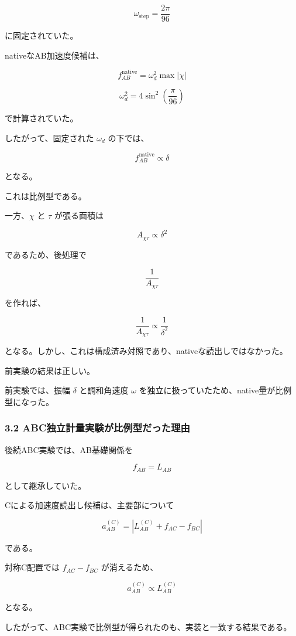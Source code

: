 \documentclass[
  a4paper,
]{ltjsarticle}
\begin{document}
\[
\omega_{\mathrm{step}}
=\frac{2\pi}{96}
\]

に固定されていた。

nativeなAB加速度候補は、

\[
f_{AB}^{\mathrm{native}}
=\omega_d^2\max|\chi|
\]

\[
\omega_d^2
=4\sin^2\left(\frac{\pi}{96}\right)
\]

で計算されていた。

したがって、固定された \(\omega_d\) の下では、

\[
f_{AB}^{\mathrm{native}}\propto\delta
\]

となる。

これは比例型である。

一方、\(\chi\) と \(\tau\) が張る面積は

\[
A_{\chi\tau}\propto\delta^2
\]

であるため、後処理で

\[
\frac{1}{A_{\chi\tau}}
\]

を作れば、

\[
\frac{1}{A_{\chi\tau}}
\propto\frac{1}{\delta^2}
\]

となる。しかし、これは構成済み対照であり、nativeな読出しではなかった。

前実験の結果は正しい。

前実験では、振幅 \(\delta\) と調和角速度 \(\omega\)
を独立に扱っていたため、native量が比例型になった。

\subsubsection{3.2
ABC独立計量実験が比例型だった理由}\label{abcux72ecux7acbux8a08ux91cfux5b9fux9a13ux304cux6bd4ux4f8bux578bux3060ux3063ux305fux7406ux7531}

後続ABC実験では、AB基礎関係を

\[
f_{AB}=L_{AB}
\]

として継承していた。

Cによる加速度読出し候補は、主要部について

\[
a_{AB}^{(C)}
=\left|L_{AB}^{(C)}+f_{AC}-f_{BC}\right|
\]

である。

対称C配置では \(f_{AC}-f_{BC}\) が消えるため、

\[
a_{AB}^{(C)}\propto L_{AB}^{(C)}
\]

となる。

したがって、ABC実験で比例型が得られたのも、実装と一致する結果である。
\end{document}
